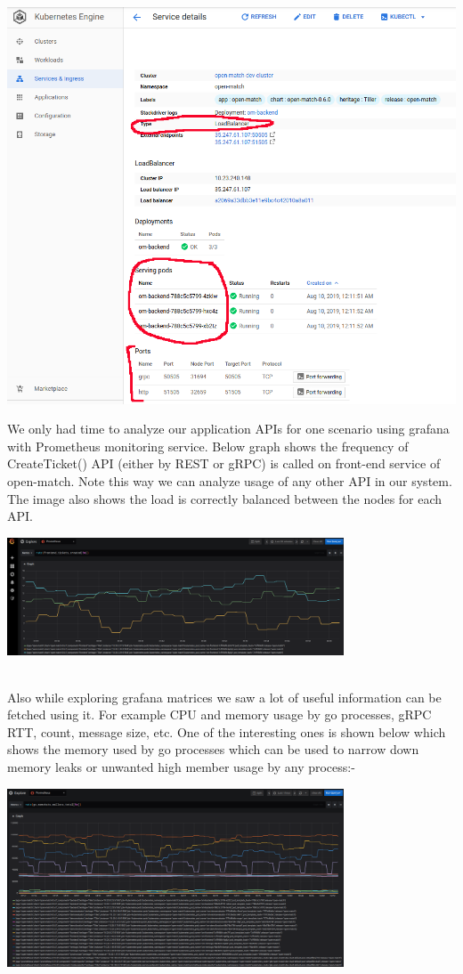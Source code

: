 \documentclass[12pt, letter]{article}
\begin{document}
\centerline{
   \includegraphics[width=.75\textwidth]{images/servicedetails.png}
}

We only had time to analyze our application APIs for one scenario using grafana with Prometheus monitoring service. Below graph shows the frequency of CreateTicket() API (either by REST or gRPC) is called on front-end service of open-match. Note this way we can analyze usage of any other API in our system. The image also shows the load is correctly balanced between the nodes for each API.

\centerline{
   \includegraphics[width=0.75\textwidth]{images/frontendCreateT.png}
}

\\

Also while exploring grafana matrices we saw a lot of useful information can be fetched using it. For example CPU and memory usage by go processes, gRPC RTT, count, message size, etc. One of the interesting ones is shown below which shows the memory used by go processes which can be used to narrow down memory leaks or unwanted high member usage by any process:-

\centerline{
   \includegraphics[width=0.75\textwidth]{images/gomemstats.png}
}
\end{document}
